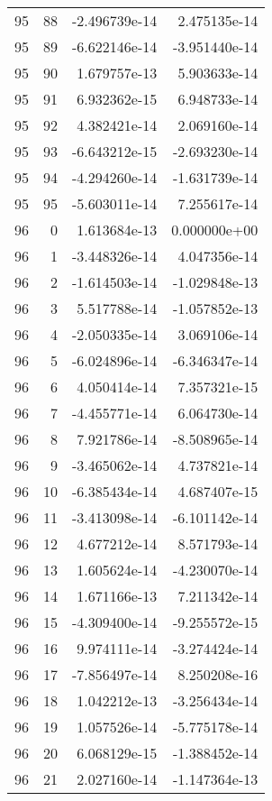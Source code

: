 \begin{tabular}{rrrr}
  95 &   88 & -2.496739e-14 &  2.475135e-14 \\
  95 &   89 & -6.622146e-14 & -3.951440e-14 \\
  95 &   90 &  1.679757e-13 &  5.903633e-14 \\
  95 &   91 &  6.932362e-15 &  6.948733e-14 \\
  95 &   92 &  4.382421e-14 &  2.069160e-14 \\
  95 &   93 & -6.643212e-15 & -2.693230e-14 \\
  95 &   94 & -4.294260e-14 & -1.631739e-14 \\
  95 &   95 & -5.603011e-14 &  7.255617e-14 \\
  96 &    0 &  1.613684e-13 &  0.000000e+00 \\
  96 &    1 & -3.448326e-14 &  4.047356e-14 \\
  96 &    2 & -1.614503e-14 & -1.029848e-13 \\
  96 &    3 &  5.517788e-14 & -1.057852e-13 \\
  96 &    4 & -2.050335e-14 &  3.069106e-14 \\
  96 &    5 & -6.024896e-14 & -6.346347e-14 \\
  96 &    6 &  4.050414e-14 &  7.357321e-15 \\
  96 &    7 & -4.455771e-14 &  6.064730e-14 \\
  96 &    8 &  7.921786e-14 & -8.508965e-14 \\
  96 &    9 & -3.465062e-14 &  4.737821e-14 \\
  96 &   10 & -6.385434e-14 &  4.687407e-15 \\
  96 &   11 & -3.413098e-14 & -6.101142e-14 \\
  96 &   12 &  4.677212e-14 &  8.571793e-14 \\
  96 &   13 &  1.605624e-14 & -4.230070e-14 \\
  96 &   14 &  1.671166e-13 &  7.211342e-14 \\
  96 &   15 & -4.309400e-14 & -9.255572e-15 \\
  96 &   16 &  9.974111e-14 & -3.274424e-14 \\
  96 &   17 & -7.856497e-14 &  8.250208e-16 \\
  96 &   18 &  1.042212e-13 & -3.256434e-14 \\
  96 &   19 &  1.057526e-14 & -5.775178e-14 \\
  96 &   20 &  6.068129e-15 & -1.388452e-14 \\
  96 &   21 &  2.027160e-14 & -1.147364e-13 \\

\end{tabular}

